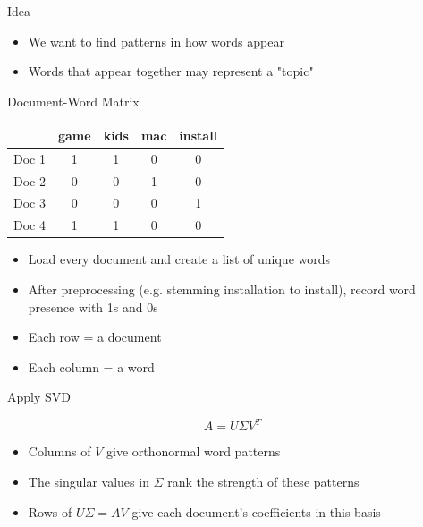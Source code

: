 \documentclass[10pt]{beamer}
\begin{document}
\begin{frame}{Idea}

\begin{itemize}
\item We want to find patterns in how words appear
\item Words that appear together may represent a "topic"
\end{itemize}

\vspace{4mm}


\end{frame}
\begin{frame}{Document-Word Matrix}


\begin{center}
\begin{tabular}{c|cccc}
 & game & kids & mac & install \\
\hline
Doc 1 & 1 & 1 & 0 & 0 \\
Doc 2 & 0 & 0 & 1 & 0 \\
Doc 3 & 0 & 0 & 0 & 1 \\
Doc 4 & 1 & 1 & 0 & 0 \\
\end{tabular}
\end{center}

\vspace{3mm}

\begin{itemize}
\item Load every document and create a list of unique words
\item After preprocessing (e.g. stemming installation to install), record word presence with 1s and 0s
\item Each row = a document
\item Each column = a word
\end{itemize}

\end{frame}
\begin{frame}{Apply SVD}

\[
A = U \Sigma V^T
\]

\vspace{3mm}

\begin{itemize}
\item Columns of $V$ give orthonormal word patterns
\item The singular values in $\Sigma$ rank the strength of these patterns
\item Rows of $U\Sigma=AV$ give each document's coefficients in this basis
\end{itemize}

\end{frame}
\end{document}
